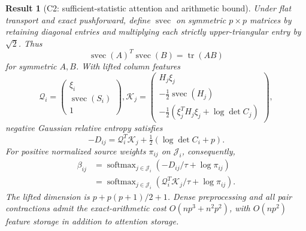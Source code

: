 \documentclass[11pt]{article}
\newtheorem{result}{Result}
\newcommand{\tr}{\operatorname{tr}}
\newcommand{\svec}{\operatorname{svec}}
\newcommand{\softmax}{\operatorname{softmax}}
\begin{document}
\begin{result}[C2: sufficient-statistic attention and arithmetic bound]
\label{res:C2}
Under flat transport and exact pushforward, define $\svec$ on symmetric $p\times p$ matrices by retaining diagonal entries and multiplying each strictly upper-triangular entry by $\sqrt2$. Thus
\begin{equation}
\svec(A)^T\svec(B)=\tr(AB)
\label{eq:svec}
\end{equation}
for symmetric $A,B$. With lifted column features
\begin{equation}
\mathcal Q_i=\begin{pmatrix}\xi_i\\\svec(S_i)\\1\end{pmatrix},
\mathcal K_j=\begin{pmatrix}H_j\xi_j\\-\tfrac12\svec(H_j)\\
-\tfrac12(\xi_j^TH_j\xi_j+\log\det C_j)\end{pmatrix},
\label{eq:lifted-features}
\end{equation}
negative Gaussian relative entropy satisfies
\begin{equation}
-D_{ij}=\mathcal Q_i^T\mathcal K_j+\tfrac12(\log\det C_i+p).
\label{eq:lifted-score}
\end{equation}
For positive normalized source weights $\pi_{ij}$ on $\mathcal J_i$, consequently,
\begin{equation}
\begin{split}
\beta_{ij}&=\softmax_{j\in\mathcal J_i}(-D_{ij}/\tau+\log\pi_{ij})\\
&=\softmax_{j\in\mathcal J_i}(\mathcal Q_i^T\mathcal K_j/\tau+\log\pi_{ij}).
\end{split}
\label{eq:lifted-attention}
\end{equation}
The lifted dimension is $p+p(p+1)/2+1$. Dense preprocessing and all pair contractions admit the exact-arithmetic cost $O(np^3+n^2p^2)$, with $O(np^2)$ feature storage in addition to attention storage.
\end{result}
\end{document}
